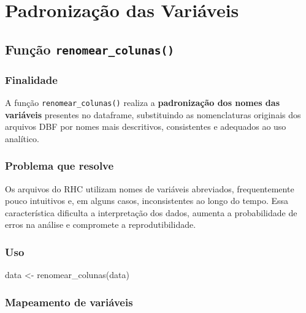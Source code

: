 \documentclass[
  brazilian,
  a4paper,
  oneside]{scrbook}
\newenvironment{Shaded}{\begin{snugshade}}{\end{snugshade}}
\newcommand{\FunctionTok}[1]{\textcolor[rgb]{0.28,0.35,0.67}{#1}}
\newcommand{\NormalTok}[1]{\textcolor[rgb]{0.00,0.23,0.31}{#1}}
\newcommand{\OtherTok}[1]{\textcolor[rgb]{0.00,0.23,0.31}{#1}}
\begin{document}

\chapter{Padronização das
Variáveis}\label{padronizauxe7uxe3o-das-variuxe1veis}

\section{\texorpdfstring{Função
\texttt{renomear\_colunas()}}{Função renomear\_colunas()}}\label{funuxe7uxe3o-renomear_colunas}

\subsection{Finalidade}\label{finalidade-1}

A função \texttt{renomear\_colunas()} realiza a \textbf{padronização dos
nomes das variáveis} presentes no dataframe, substituindo as
nomenclaturas originais dos arquivos DBF por nomes mais descritivos,
consistentes e adequados ao uso analítico.

\subsection{Problema que resolve}\label{problema-que-resolve-1}

Os arquivos do RHC utilizam nomes de variáveis abreviados,
frequentemente pouco intuitivos e, em alguns casos, inconsistentes ao
longo do tempo. Essa característica dificulta a interpretação dos dados,
aumenta a probabilidade de erros na análise e compromete a
reprodutibilidade.

\subsection{Uso}\label{uso-1}

\begin{Shaded}
\begin{Highlighting}[]
\NormalTok{data }\OtherTok{\textless{}{-}} \FunctionTok{renomear\_colunas}\NormalTok{(data)}
\end{Highlighting}
\end{Shaded}

\subsection{Mapeamento de variáveis}\label{mapeamento-de-variuxe1veis}
\end{document}
